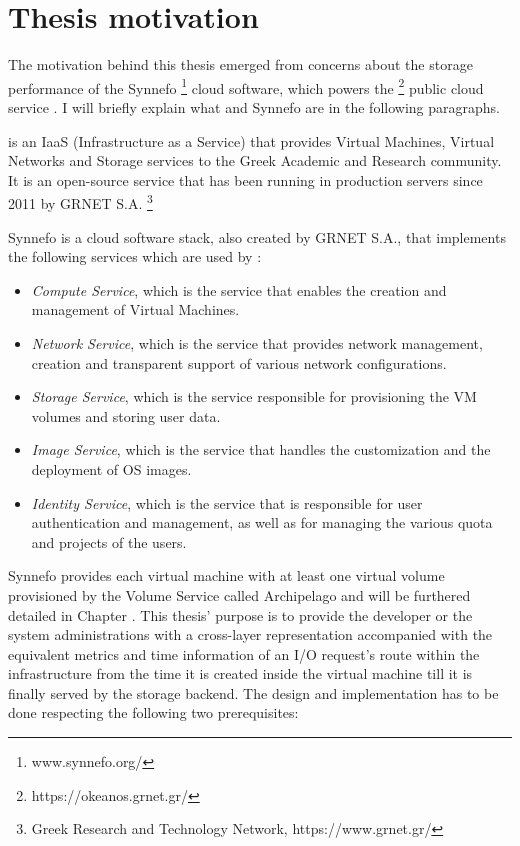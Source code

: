 \section{Thesis motivation}
The motivation behind this thesis emerged from concerns about the storage 
performance of the Synnefo \footnote{www.synnefo.org/} cloud software, which 
powers the \okeanos \footnote{https://okeanos.grnet.gr/} public cloud service 
\cite{okeanos}. I will briefly explain what \okeanos and Synnefo are in the 
following paragraphs.

\okeanos is an IaaS (Infrastructure as a Service) that provides Virtual 
Machines, Virtual Networks and Storage services to the Greek Academic and 
Research community. It is an open-source service that has been running in 
production servers since 2011 by GRNET S.A.
\footnote{Greek Research and Technology Network, https://www.grnet.gr/}

Synnefo \cite{synnefo} is a cloud software stack, also created by GRNET S.A., 
that implements the following services which are used by \okeanos:

\begin{itemize}
    \item \textit{Compute Service}, which is the service that enables the 
        creation and management of Virtual Machines.
    \item \textit{Network Service}, which is the service that provides network 
        management, creation and transparent support of various network 
        configurations.
    \item \textit{Storage Service}, which is the service responsible for 
        provisioning the VM volumes and storing user data.
    \item \textit{Image Service}, which is the service that handles the 
        customization and the deployment of OS images.
    \item \textit{Identity Service}, which is the service that is responsible 
        for user authentication and management, as well as for managing the 
        various quota and projects of the users.
\end{itemize}

Synnefo provides each virtual machine with at least one virtual volume
provisioned by the Volume Service called Archipelago\cite{archip-paper} and will
be furthered detailed in Chapter \label{}. This thesis' purpose is to provide
the developer or the system administrations with a cross-layer representation
accompanied with the equivalent metrics and time information of an I/O request's
route within the infrastructure from the time it is created inside the virtual
machine till it is finally served by the storage backend. The design and
implementation has to be done respecting the following two prerequisites:

